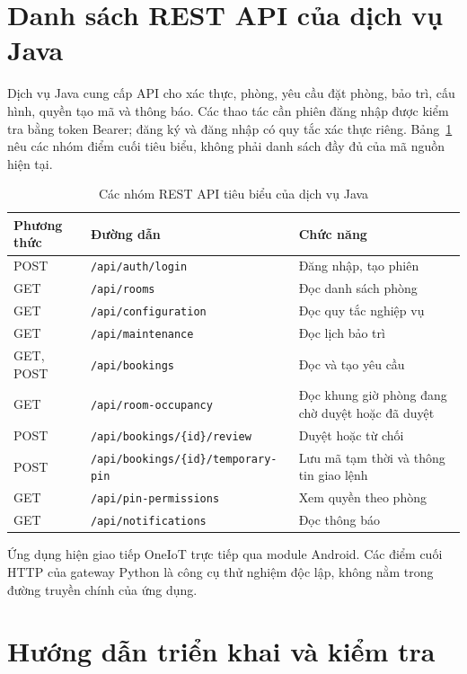 \documentclass[../DoAn.tex]{subfiles}
\begin{document}
\section{Danh sách REST API của dịch vụ Java}
Dịch vụ Java cung cấp API cho xác thực, phòng, yêu cầu đặt phòng, bảo trì, cấu hình, quyền tạo mã và thông báo. Các thao tác cần phiên đăng nhập được kiểm tra bằng token Bearer; đăng ký và đăng nhập có quy tắc xác thực riêng. Bảng~\ref{tab:api} nêu các nhóm điểm cuối tiêu biểu, không phải danh sách đầy đủ của mã nguồn hiện tại.

\begin{table}[H]\centering\small\renewcommand{\arraystretch}{1.15}
\caption{Các nhóm REST API tiêu biểu của dịch vụ Java}\label{tab:api}
\begin{tabularx}{\textwidth}{|p{1.5cm}|p{5.5cm}|X|}\hline
\textbf{Phương thức} & \textbf{Đường dẫn} & \textbf{Chức năng} \\ \hline
POST & \texttt{/api/auth/login} & Đăng nhập, tạo phiên \\ \hline
GET & \texttt{/api/rooms} & Đọc danh sách phòng \\ \hline
GET & \texttt{/api/configuration} & Đọc quy tắc nghiệp vụ \\ \hline
GET & \texttt{/api/maintenance} & Đọc lịch bảo trì \\ \hline
GET, POST & \texttt{/api/bookings} & Đọc và tạo yêu cầu \\ \hline
GET & \texttt{/api/room-occupancy} & Đọc khung giờ phòng đang chờ duyệt hoặc đã duyệt \\ \hline
POST & \texttt{/api/bookings/}\newline\texttt{\{id\}/review} & Duyệt hoặc từ chối \\ \hline
POST & \texttt{/api/bookings/}\newline\texttt{\{id\}/temporary-pin} & Lưu mã tạm thời và thông tin giao lệnh \\ \hline
GET & \texttt{/api/pin-permissions} & Xem quyền theo phòng \\ \hline
GET & \texttt{/api/notifications} & Đọc thông báo \\ \hline
\end{tabularx}\end{table}

Ứng dụng hiện giao tiếp OneIoT trực tiếp qua module Android. Các điểm cuối HTTP của gateway Python là công cụ thử nghiệm độc lập, không nằm trong đường truyền chính của ứng dụng.

\section{Hướng dẫn triển khai và kiểm tra}
\end{document}
